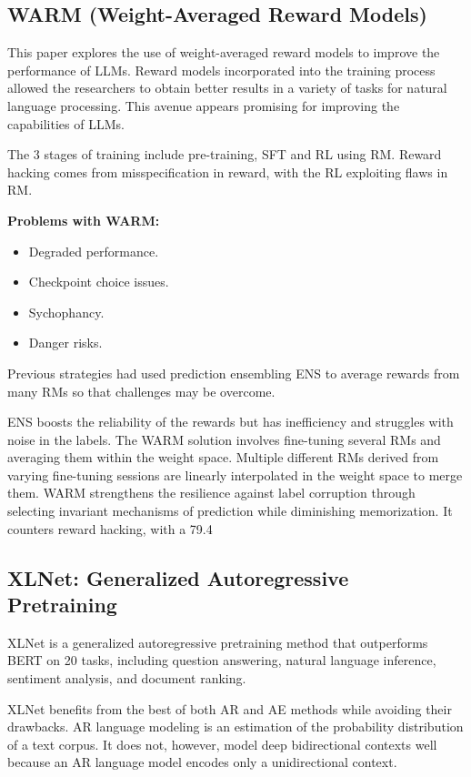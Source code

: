 \subsection{WARM (Weight-Averaged Reward Models)}

\cite{WARM:1} This paper explores the use of weight-averaged reward models to improve the performance of LLMs. Reward models incorporated into the training process allowed the researchers to obtain better results in a variety of tasks for natural language processing. This avenue appears promising for improving the capabilities of LLMs.

\cite{WARM:1} The 3 stages of training include pre-training, SFT and RL using RM. Reward hacking comes from misspecification in reward, with the RL exploiting flaws in RM.

\textbf{Problems with WARM:}
\begin{itemize}
    \item Degraded performance.
    \item Checkpoint choice issues.
    \item Sychophancy.
    \item Danger risks.
\end{itemize}

Previous strategies had used prediction ensembling ENS to average rewards from many RMs so that challenges may be overcome.

ENS boosts the reliability of the rewards but has inefficiency and struggles with noise in the labels. The WARM solution involves fine-tuning several RMs and averaging them within the weight space. Multiple different RMs derived from varying fine-tuning sessions are linearly interpolated in the weight space to merge them. WARM strengthens the resilience against label corruption through selecting invariant mechanisms of prediction while diminishing memorization. It counters reward hacking, with a 79.4%

\subsection{XLNet: Generalized Autoregressive Pretraining}

XLNet is a generalized autoregressive pretraining method that outperforms BERT on 20 tasks, including question answering, natural language inference, sentiment analysis, and document ranking.

\cite{XLNet:1} XLNet benefits from the best of both AR and AE methods while avoiding their drawbacks. AR language modeling is an estimation of the probability distribution of a text corpus. It does not, however, model deep bidirectional contexts well because an AR language model encodes only a unidirectional context.

